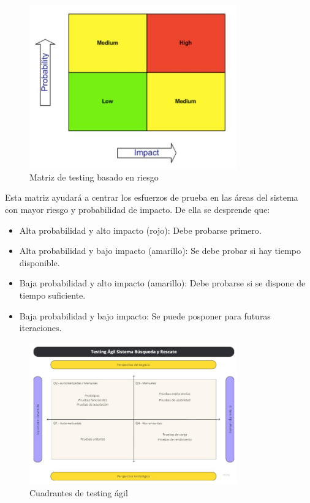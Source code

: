 \begin{figure}[H]
    \centering
    \includegraphics[width=0.8\textwidth]{../imagenes/secciones/8-Gestion-de-la-Calidad/matriz de testing basado en riesgo.jpg}
    \caption{Matriz de testing basado en riesgo}
    \label{fig:matriTestRiesgo}
\end{figure}

Esta matriz ayudará a centrar los esfuerzos de prueba en las áreas del sistema con mayor riesgo y probabilidad de impacto. 
De ella se desprende que:

\begin{itemize}
    \item Alta probabilidad y alto impacto (rojo): Debe probarse primero.
    \item Alta probabilidad y bajo impacto (amarillo): Se debe probar si hay tiempo disponible.
    \item Baja probabilidad y alto impacto (amarillo): Debe probarse si se dispone de tiempo suficiente.
    \item Baja probabilidad y bajo impacto: Se puede posponer para futuras iteraciones.
\end{itemize}

\begin{figure}[H]
    \centering
    \includegraphics[width=0.8\textwidth]{../imagenes/secciones/8-Gestion-de-la-Calidad/Cuadrantes testing agil .jpg}
    \caption{Cuadrantes de testing ágil}
    \label{fig:cuadrantesTesting}
\end{figure}


